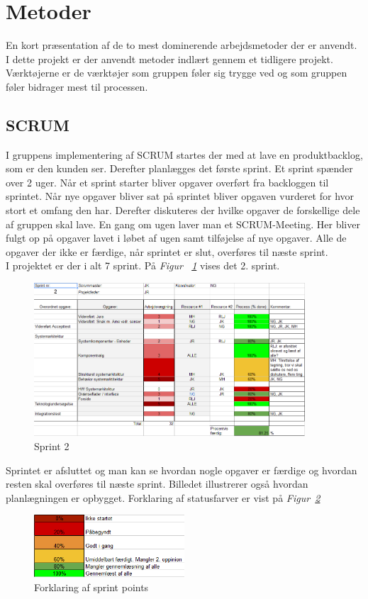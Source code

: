 \section{Metoder}
En kort præsentation af de to mest dominerende arbejdsmetoder der er anvendt.\\

I dette projekt er der anvendt metoder indlært gennem et tidligere projekt. Værktøjerne er de værktøjer som gruppen føler sig trygge ved og som gruppen føler bidrager mest til processen. 
\subsection{SCRUM}
I gruppens implementering af SCRUM startes der med at lave en produktbacklog, som er den kunden ser.  Derefter planlægges det første sprint. Et sprint spænder over 2 uger. Når et sprint starter bliver opgaver overført fra backloggen til sprintet. Når nye opgaver bliver sat på sprintet bliver opgaven vurderet for hvor stort et omfang den har. Derefter diskuteres der hvilke opgaver de forskellige dele af gruppen skal lave. En gang om ugen laver man et SCRUM-Meeting. Her bliver fulgt op på opgaver lavet i løbet af ugen samt tilføjelse af nye opgaver. Alle de opgaver der ikke er færdige, når sprintet er slut, overføres til næste sprint.\\
I projektet er der i alt 7 sprint. På \textit{Figur ~\ref{fig:SCRUM}} vises det 2. sprint.
\begin{figure}[H]
\centering
\includegraphics[width=0.9\textwidth]{billeder/SCRUM1}
\caption{Sprint 2}
\label{fig:SCRUM}
\end{figure}
Sprintet er afsluttet og man kan se hvordan nogle opgaver er færdige og hvordan resten skal overføres til næste sprint. Billedet illustrerer også hvordan planlægningen er opbygget. Forklaring af statusfarver er vist på \textit{Figur~\ref{fig:SCRUM2}}
\begin{figure}[H]
\centering
\includegraphics[width=0.5\textwidth]{billeder/SCRUM2}
\caption{Forklaring af sprint points}
\label{fig:SCRUM2}
\end{figure}
